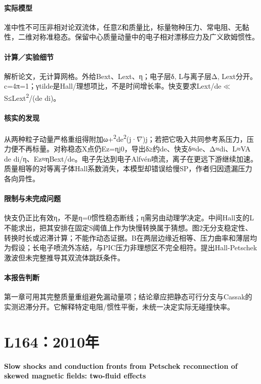 \paragraph{实际模型}准中性不可压非相对论双流体，任意Z和质量比，标量物种压力、常电阻、无黏性，二维对称准稳态。保留中心质量动量中的电子相对漂移应力及广义欧姆惯性。

\paragraph{计算／实验细节}解析论文，无计算网格。外给Bext、Lext、η；电子层δ, L与离子层Δ, Lext分开。c=4π=1；γtilde是Hall/理想项比，不是时间增长率。快支要求Lext/de\ensuremath{\ll}S≤Lext\textsuperscript{2}/(de di)。

\paragraph{核实的发现}从两种粒子动量严格重组得附加ω+\textsuperscript{2}de\textsuperscript{2}(j·\ensuremath{\nabla})j；若把它吸入共同参考系压力，压力便不再标量。对称稳态X点仍Ez=ηj0，导出δ≥约de、快支δ≈de、Δ≈di、L≈VA de di/η、Ez≈ηBext/de。电子先达到电子Alfvén喷流，离子在更远下游继续加速。质量相等的对等离子体Hall系数消失，本模型却错误给慢SP，作者归因遗漏压力各向异性。

\paragraph{限制与未完成问题}快支仍正比有效η，不是η=0惯性稳态断线；η需另由动理学决定。中间Hall支的L不能求出，把其安排在固定S阈值上作为快慢转换属于猜想。图2无分支稳定性、转换时长或迟滞计算；不能作动态证据。B在两层边缘近相等、压力曲率和薄层均为假设；长电子喷流外冻结，与PIC压力非理想区不完全相符。提出Hall-Petschek激波但未完整推导其双流体跳跃条件。

\paragraph{本报告判断}第一章可用其完整质量重组避免漏动量项；结论章应把静态可行分支与Cassak的实测迟滞分开。它解释特定电阻/惯性平衡，未统一决定实际无碰撞快率。

\section{L164：2010年}\label{paper:L164}

\textbf{Slow shocks and conduction fronts from Petschek reconnection of skewed magnetic fields: two-fluid effects}\citep{L164}\

